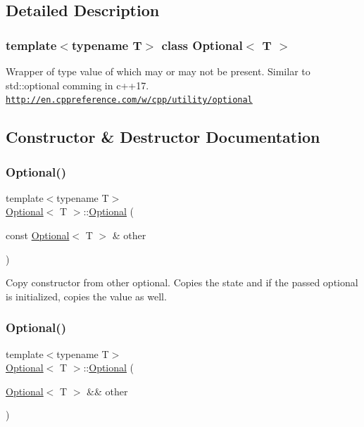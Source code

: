 \subsection{Detailed Description}
\subsubsection*{template$<$typename T$>$\newline
class Optional$<$ T $>$}

Wrapper of type value of which may or may not be present. Similar to std\+::optional comming in c++17. \href{http://en.cppreference.com/w/cpp/utility/optional}{\tt http\+://en.\+cppreference.\+com/w/cpp/utility/optional} 

\subsection{Constructor \& Destructor Documentation}
\hypertarget{classOptional_a099b0dce0d5fedf466ca51057dd9eb5c}{}\label{classOptional_a099b0dce0d5fedf466ca51057dd9eb5c} 
\subsubsection{\texorpdfstring{Optional()}{Optional()}\hspace{0.1cm}{\footnotesize\ttfamily [1/2]}}
{\footnotesize\ttfamily template$<$typename T$>$ \\
\hyperlink{classOptional}{Optional}$<$ T $>$\+::\hyperlink{classOptional}{Optional} (\begin{DoxyParamCaption}\item[{const \hyperlink{classOptional}{Optional}$<$ T $>$ \&}]{other }\end{DoxyParamCaption})\hspace{0.3cm}{\ttfamily [inline]}}

Copy constructor from other optional. Copies the state and if the passed optional is initialized, copies the value as well. \hypertarget{classOptional_a114c41318cb918540e6b0bac8159239c}{}\label{classOptional_a114c41318cb918540e6b0bac8159239c} 
\subsubsection{\texorpdfstring{Optional()}{Optional()}\hspace{0.1cm}{\footnotesize\ttfamily [2/2]}}
{\footnotesize\ttfamily template$<$typename T$>$ \\
\hyperlink{classOptional}{Optional}$<$ T $>$\+::\hyperlink{classOptional}{Optional} (\begin{DoxyParamCaption}\item[{\hyperlink{classOptional}{Optional}$<$ T $>$ \&\&}]{other }\end{DoxyParamCaption})\hspace{0.3cm}{\ttfamily [inline]}}

